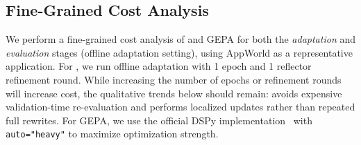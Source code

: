 \begin{table}[t!]
  \centering
  \caption{\textbf{Results on Text-to-SQL Benchmark (DeepSeek-V3.1-671B as the Base LLM).} We use BIRD-SQL from StreamBench.}
  \label{tab:birdsql-streambench}
\end{table}

\subsection{Fine-Grained Cost Analysis}
\label{subsec:fine-grained-cost-breakdown}

We perform a fine-grained cost analysis of \name and GEPA for both the \emph{adaptation} and \emph{evaluation} stages (offline adaptation setting), using AppWorld as a representative application.
For \name, we run offline adaptation with 1 epoch and 1 reflector refinement round.
While increasing the number of epochs or refinement rounds will increase cost, the qualitative trends below should remain: \name avoids expensive validation-time re-evaluation and performs localized updates rather than repeated full rewrites.
For GEPA, we use the official DSPy implementation~\citep{DSPyMIPROv2} with \verb|auto="heavy"| to maximize optimization strength.

